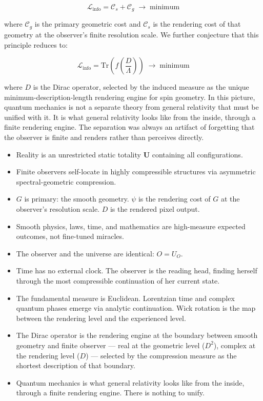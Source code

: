 \documentclass[12pt,a4paper]{article}
\newcommand{\iame}{\textsc{IAME}}
\newcommand{\Linfo}{\mathcal{L}_{\mathrm{info}}}
\newcommand{\Cs}{\mathcal{C}_s}
\newcommand{\Cg}{\mathcal{C}_g}
\begin{document}
\begin{equation*}
\Linfo = \Cs + \Cg \;\longrightarrow\; \text{minimum}
\end{equation*}

where $\Cg$ is the primary geometric cost and $\Cs$ is the rendering cost of
that geometry at the observer's finite resolution scale. We further conjecture
that this principle reduces to:

\begin{equation*}
\Linfo = \mathrm{Tr}\!\left(f\!\left(\frac{D}{\Lambda}\right)\right)
\;\longrightarrow\; \text{minimum}
\end{equation*}

where $D$ is the Dirac operator, selected by the induced measure as the
unique minimum-description-length rendering engine for spin geometry. In this
picture, quantum mechanics is not a separate theory from general relativity
that must be unified with it. It is what general relativity looks like from
the inside, through a finite rendering engine. The separation was always an
artifact of forgetting that the observer is finite and renders rather than
perceives directly.

\begin{tcolorbox}[title=Summary: \iame{}]
\begin{itemize}[leftmargin=*]
\item Reality is an unrestricted static totality $\mathbf{U}$ containing all
      configurations.
\item Finite observers self-locate in highly compressible structures via
      asymmetric spectral-geometric compression.
\item $G$ is primary: the smooth geometry. $\psi$ is the rendering cost of
      $G$ at the observer's resolution scale. $D$ is the rendered pixel output.
\item Smooth physics, laws, time, and mathematics are high-measure expected
      outcomes, not fine-tuned miracles.
\item The observer and the universe are identical: $O = U_O$.
\item Time has no external clock. The observer is the reading head, finding
      herself through the most compressible continuation of her current state.
\item The fundamental measure is Euclidean. Lorentzian time and complex quantum
      phases emerge via analytic continuation. Wick rotation is the map between
      the rendering level and the experienced level.
\item The Dirac operator is the rendering engine at the boundary between smooth
      geometry and finite observer --- real at the geometric level ($D^2$),
      complex at the rendering level ($D$) --- selected by the compression
      measure as the shortest description of that boundary.
\item Quantum mechanics is what general relativity looks like from the inside,
      through a finite rendering engine. There is nothing to unify.
\end{itemize}
\end{tcolorbox}


\printbibliography
\end{document}
